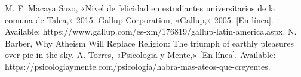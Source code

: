\documentclass[conference]{IEEEtran}
\begin{document}
\begin{thebibliography}{99}
M. F. Macaya Sazo, «Nivel de felicidad en estudiantes universitarios de la comuna de Talca,» 2015. 
Gallup Corporation, «Gallup,» 2005. [En línea]. Available: https://www.gallup.com/es-xm/176819/gallup-latin-america.aspx.
N. Barber, Why Atheism Will Replace Religion: The triumph of earthly pleasures over pie in the sky. 
A. Torres, «Psicologia y Mente,» [En línea]. Available: https://psicologiaymente.com/psicologia/habra-mas-ateos-que-creyentes.







\end{thebibliography}
\end{document}
